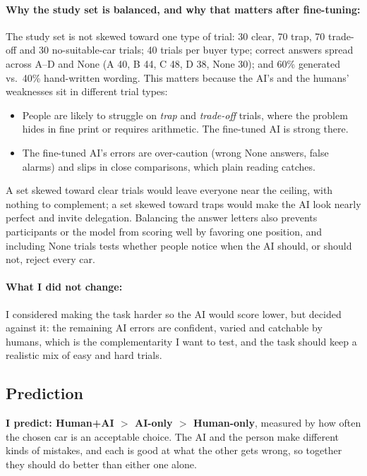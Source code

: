 \documentclass[11pt]{article}
\begin{document}
\paragraph{Why the study set is balanced, and why that matters after fine-tuning:} The study set is
not skewed toward one type of trial: 30 clear, 70 trap, 70 trade-off and 30 no-suitable-car trials;
40 trials per buyer type; correct answers spread across A--D and None (A 40, B 44, C 48, D 38,
None 30); and 60\% generated vs.\ 40\% hand-written wording. This matters because the AI's and the
humans' weaknesses sit in different trial types:
\begin{itemize}
  \item People are likely to struggle on \emph{trap} and \emph{trade-off} trials, where the problem
  hides in fine print or requires arithmetic. The fine-tuned AI is strong there.
  \item The fine-tuned AI's errors are over-caution (wrong None answers, false alarms) and slips in
  close comparisons, which plain reading catches.
\end{itemize}
A set skewed toward clear trials would leave everyone near the ceiling, with nothing to
complement; a set skewed toward traps would make the AI look nearly perfect and invite
delegation. Balancing the answer letters also prevents participants or the model from scoring
well by favoring one position, and including None trials tests whether people notice when the AI
should, or should not, reject every car.

\paragraph{What I did not change:} I considered making the task harder so the AI would score
lower, but decided against it: the remaining AI errors are confident, varied and catchable by
humans, which is the complementarity I want to test, and the task should keep a realistic mix of
easy and hard trials.

\subsection{Prediction}\label{sec:prediction}

\textbf{I predict: Human+AI $>$ AI-only $>$ Human-only}, measured by how often the chosen car is
an acceptable choice. The AI and the person make different kinds of mistakes, and each is good
at what the other gets wrong, so together they should do better than either one alone.
\end{document}

